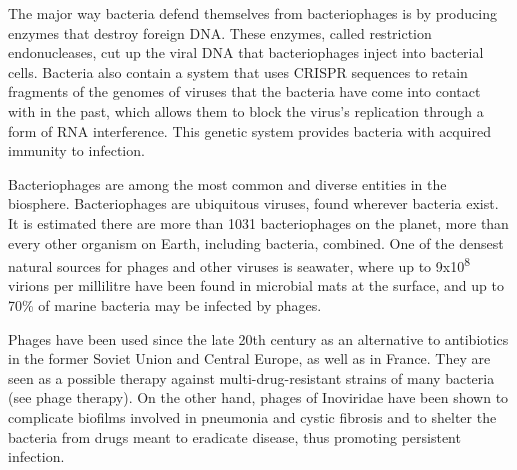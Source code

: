 The major way bacteria defend themselves from bacteriophages is by producing enzymes that destroy foreign DNA. These enzymes, called restriction endonucleases, cut up the viral DNA that bacteriophages inject into bacterial cells. Bacteria also contain a system that uses CRISPR sequences to retain fragments of the genomes of viruses that the bacteria have come into contact with in the past, which allows them to block the virus's replication through a form of RNA interference. This genetic system provides bacteria with acquired immunity to infection.

Bacteriophages are among the most common and diverse entities in the biosphere. Bacteriophages are ubiquitous viruses, found wherever bacteria exist. It is estimated there are more than 1031 bacteriophages on the planet, more than every other organism on Earth, including bacteria, combined. One of the densest natural sources for phages and other viruses is seawater, where up to 9x10\textsuperscript{8} virions per millilitre have been found in microbial mats at the surface, and up to 70\% of marine bacteria may be infected by phages.

Phages have been used since the late 20th century as an alternative to antibiotics in the former Soviet Union and Central Europe, as well as in France. They are seen as a possible therapy against multi-drug-resistant strains of many bacteria (see phage therapy). On the other hand, phages of Inoviridae have been shown to complicate biofilms involved in pneumonia and cystic fibrosis and to shelter the bacteria from drugs meant to eradicate disease, thus promoting persistent infection.


